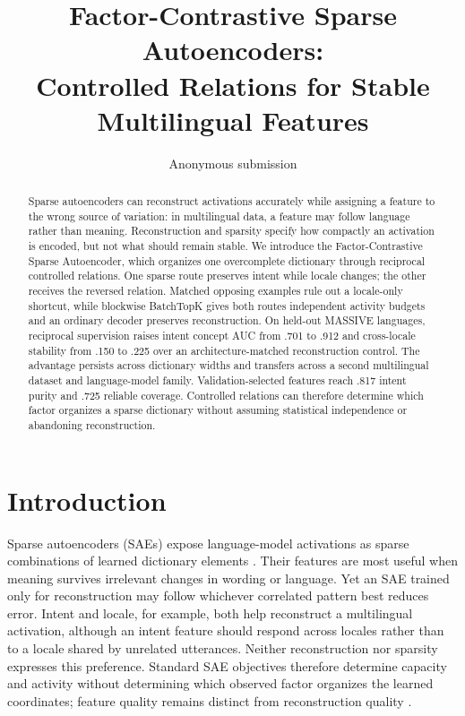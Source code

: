 \documentclass[11pt]{article}
\title{Factor-Contrastive Sparse Autoencoders:\\Controlled Relations for Stable Multilingual Features}
\author{Anonymous submission}
\begin{document}
\maketitle

\begin{abstract}
Sparse autoencoders can reconstruct activations accurately while assigning a feature to the wrong source of variation: in multilingual data, a feature may follow language rather than meaning. Reconstruction and sparsity specify how compactly an activation is encoded, but not what should remain stable. We introduce the Factor-Contrastive Sparse Autoencoder, which organizes one overcomplete dictionary through reciprocal controlled relations. One sparse route preserves intent while locale changes; the other receives the reversed relation. Matched opposing examples rule out a locale-only shortcut, while blockwise BatchTopK gives both routes independent activity budgets and an ordinary decoder preserves reconstruction. On held-out MASSIVE languages, reciprocal supervision raises intent concept AUC from .701 to .912 and cross-locale stability from .150 to .225 over an architecture-matched reconstruction control. The advantage persists across dictionary widths and transfers across a second multilingual dataset and language-model family. Validation-selected features reach .817 intent purity and .725 reliable coverage. Controlled relations can therefore determine which factor organizes a sparse dictionary without assuming statistical independence or abandoning reconstruction.
\end{abstract}

\section{Introduction}

Sparse autoencoders (SAEs) expose language-model activations as sparse combinations of learned dictionary elements \citep{cunningham2023sparse,gao2024scaling,lieberum2024gemmascope}. Their features are most useful when meaning survives irrelevant changes in wording or language. Yet an SAE trained only for reconstruction may follow whichever correlated pattern best reduces error. Intent and locale, for example, both help reconstruct a multilingual activation, although an intent feature should respond across locales rather than to a locale shared by unrelated utterances. Neither reconstruction nor sparsity expresses this preference. Standard SAE objectives therefore determine capacity and activity without determining which observed factor organizes the learned coordinates; feature quality remains distinct from reconstruction quality \citep{karvonen2025saebench}.
\end{document}
